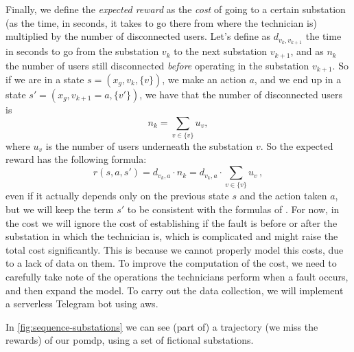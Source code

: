 Finally, we define the \emph{expected reward} as the \emph{cost} of going to a certain substation (as the time, in seconds, it takes to go there from where the technician is) multiplied by the number of disconnected users. Let's define as $d_{v_k, v_{k+1}}$ the time in seconds to go from the substation $v_k$ to the next substation $v_{k+1}$, and as $n_{k}$ the number of users still disconnected \emph{before} operating in the substation $v_{k+1}$. So if we are in a state $s = (x_g, v_k, \{v\})$, we make an action $a$, and we end up in a state $s' = (x_g, v_{k+1} = a, \{v'\})$, we have that the number of disconnected users is
\begin{equation}
    n_{k} = \sum_{v \in \{v\}} u_v,
\end{equation}
where $u_v$ is the number of users underneath the substation $v$. So the expected reward has the following formula:
\begin{equation}
    r(s, a, s') = d_{v_k, a} \cdot n_{k} = d_{v_k, a} \cdot \sum_{v \in \{v\}} u_v \, ,
    \label{eq:expected-reward}
\end{equation}
even if it actually depends only on the previous state $s$ and the action taken $a$, but we will keep the term $s'$ to be consistent with the formulas of \cite{SuttonBarto}.
For now, in the cost we will ignore the cost of establishing if the fault is before or after the substation in which the technician is, which is complicated and might raise the total cost significantly. This is because we cannot properly model this costs, due to a lack of data on them. To improve the computation of the cost, we need to carefully take note of the operations the technicians perform when a fault occurs, and then expand the model. To carry out the data collection, we will implement a serverless Telegram bot using \acrshort{aws}.

In \autoref{fig:sequence-substations} we can see (part of) a trajectory (we miss the rewards) of our \acrshort{pomdp}, using a set of fictional substations.

